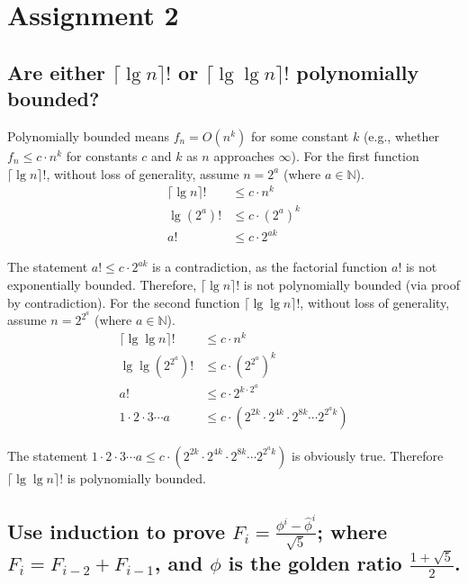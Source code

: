 \chapter{Assignment 2}


\section[Problem 1]{Are either $\lceil \lg n \rceil!$ or $\lceil \lg \lg n \rceil!$ polynomially bounded?}
Polynomially bounded means $f_n = O(n^k)$ for some constant $k$ (e.g., whether $f_n \leq c \cdot n^k$ for constants $c$ and $k$ as $n$ approaches $\infty$). For the first function $\lceil \lg n \rceil!$, without loss of generality, assume $n = 2^a$ (where $a \in \mathbb{N}$). 
\begin{align*}
	\lceil \lg n \rceil ! & \leq c \cdot n^k \\
	\lg (2^a) ! & \leq c \cdot (2^a)^k \\
	a! & \leq c \cdot 2^{ak}
\end{align*}

The statement $a! \leq c \cdot 2^{ak}$ is a contradiction, as the factorial function $a!$ is not exponentially bounded. Therefore, $\lceil \lg n \rceil!$ is not polynomially bounded (via proof by contradiction). For the second function $\lceil \lg \lg n \rceil!$, without loss of generality, assume $n = 2^{2^a}$ (where $a \in \mathbb{N}$).
\begin{align*}
	 \lceil \lg \lg n \rceil! & \leq c \cdot n^k \\
	 \lg \lg \left( 2^{2^a} \right) ! & \leq c \cdot \left( 2^{2^a} \right)^k \\
	 a! & \leq c \cdot 2^{k \cdot {2^a}} \\
	 1 \cdot 2 \cdot 3 \cdots a & \leq c \cdot \left( 2^{2k} \cdot 2^{4k} \cdot 2^{8k} \cdots 2^{2^a k} \right)
\end{align*}

The statement $1 \cdot 2 \cdot 3 \cdots a \leq c \cdot \left( 2^{2k} \cdot 2^{4k} \cdot 2^{8k} \cdots 2^{2^a k} \right)$ is obviously true. Therefore $\lceil \lg \lg n \rceil!$ is polynomially bounded.



\section[Problem 2]{Use induction to prove $F_i = \frac{\phi^i - \hat{\phi}^i}{\sqrt{5}}$; where $F_i = F_{i-2} + F_{i-1}$, and $\phi$ is the golden ratio $\frac{1 + \sqrt{5}}{2}$.}

